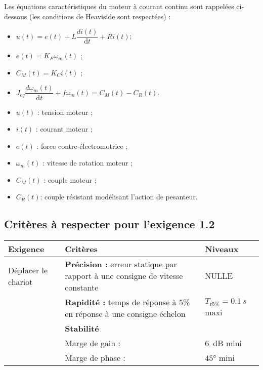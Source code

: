 Les équations caractéristiques du moteur à courant continu sont rappelées ci-dessous (les conditions de Heaviside sont respectées) :
\begin{multicols}{2}
\begin{itemize}[label=,font=\color{bleuxp}] 
\item $u(t)=e(t)+L \dfrac{di(t)}{\text{d} t}+Ri(t)$;
\item $e(t)=K_E \omega_m (t)$ ;
\item $C_M (t)=K_C i(t)$ ;
\item $J_{eq}  \dfrac{d\omega_m(t)}{\text{d} t}+f\omega_m (t)=C_M (t)-C_R (t)$.
\end{itemize}

\begin{itemize}[label=,font=\color{bleuxp}] 
\item $u(t)$ : tension moteur ;
\item $i(t)$ : courant moteur ; 
\item $e(t)$ : force contre-électromotrice ;
\item $\omega_m(t)$ : vitesse de rotation moteur ;
\item $C_M (t)$ : couple moteur ;
\item $C_R (t)$: couple résistant modélisant l'action de pesanteur.
\end{itemize}
\end{multicols}

\fi

\subsection*{Critères à respecter pour l'exigence 1.2}
\ifprof
\else
\footnotesize{
\begin{center}
\begin{tabular}{p{2.5cm}p{5cm}p{3cm}}
\hline
Exigence	& Critères & Niveaux \\ \hline
Déplacer le chariot	& \textbf{Précision :}
erreur statique par rapport à une consigne de vitesse constante	
& NULLE \\ 
	& \textbf{Rapidité :} temps de réponse à 5\% en réponse à une consigne échelon 
	& $T_{\text{r} 5\%} = \SI{0,1}{s}$  maxi \\ 
	& \textbf{Stabilité} & \\
	& Marge de gain :& \SI{6}{dB} mini \\
	&Marge de phase :& $\ang{45}$ mini \\
\hline
\end{tabular}
\end{center}}

